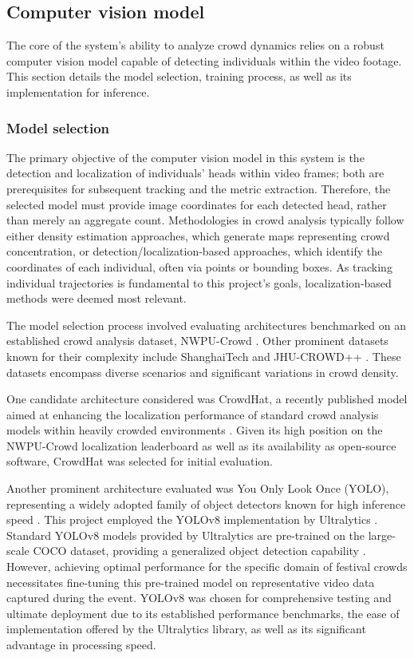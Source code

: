 \subsection{Computer vision model}
\label{sec:cv_model}

The core of the system's ability to analyze crowd dynamics relies on a robust computer vision model capable of detecting individuals within the video footage. This section details the model selection, training process, as well as its implementation for inference.

\subsubsection{Model selection}

The primary objective of the computer vision model in this system is the detection and localization of individuals' heads within video frames; both are prerequisites for subsequent tracking and the metric extraction. Therefore, the selected model must provide image coordinates for each detected head, rather than merely an aggregate count. Methodologies in crowd analysis typically follow either density estimation approaches, which generate maps representing crowd concentration, or detection/localization-based approaches, which identify the coordinates of each individual, often via points or bounding boxes. As tracking individual trajectories is fundamental to this project's goals, localization-based methods were deemed most relevant.

The model selection process involved evaluating architectures benchmarked on an established crowd analysis dataset, NWPU-Crowd \cite{nwpu}. Other prominent datasets known for their complexity include ShanghaiTech and JHU-CROWD++ \cite{shanghai_tech} \cite{jhu_crowd}. These datasets encompass diverse scenarios and significant variations in crowd density.

One candidate architecture considered was CrowdHat, a recently published model aimed at enhancing the localization performance of standard crowd analysis models within heavily crowded environments \cite{crowdhat}. Given its high position on the NWPU-Crowd localization leaderboard as well as its availability as open-source software, CrowdHat was selected for initial evaluation.

Another prominent architecture evaluated was You Only Look Once (YOLO), representing a widely adopted family of object detectors known for high inference speed \cite{yolo}. This project employed the YOLOv8 implementation by Ultralytics \cite{ultralytics}. Standard YOLOv8 models provided by Ultralytics are pre-trained on the large-scale COCO dataset, providing a generalized object detection capability \cite{coco}. However, achieving optimal performance for the specific domain of festival crowds necessitates fine-tuning this pre-trained model on representative video data captured during the event. YOLOv8 was chosen for comprehensive testing and ultimate deployment due to its established performance benchmarks, the ease of implementation offered by the Ultralytics library, as well as its significant advantage in processing speed.

